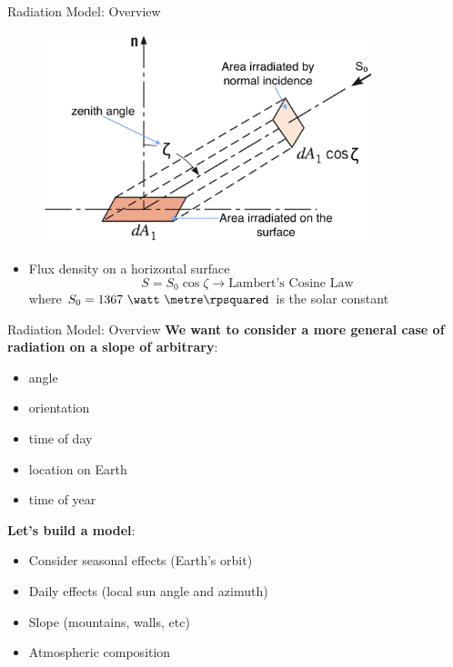 \begin{frame}{Radiation Model: Overview}
\begin{figure}
	\includegraphics[width=0.85\textwidth]{fig3}
\end{figure}
\begin{itemize}
	\item Flux density on a horizontal surface
	$$S=S_0 \cos \zeta \rightarrow \text{Lambert's Cosine Law}$$
	where $S_0 = 1367\ \watt\ \metre\rpsquared$ is the solar constant
\end{itemize}
\end{frame}


\begin{frame}{Radiation Model: Overview}
\textbf{We want to consider a more general case of radiation on a slope of arbitrary}:
\begin{itemize}
	\item angle
	\item orientation
	\item time of day
	\item location on Earth
	\item time of year 
\end{itemize}
\textbf{Let's build a model}:
\begin{itemize}
	\item Consider seasonal effects (Earth's orbit)
	\item Daily effects (local sun angle and azimuth)
	\item Slope (mountains, walls, etc)
	\item Atmospheric composition
\end{itemize}
\end{frame}

